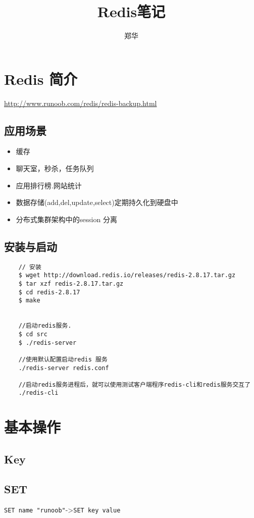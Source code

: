 \documentclass[UTF8,a4paper,12pt]{ctexbook}
\author{\kaishu 郑华}
\title{\heiti Redis笔记}
\begin{document}
 	\maketitle
  

\chapter{Redis 简介}
	
	\url{http://www.runoob.com/redis/redis-backup.html}
	
	\section{应用场景}
		\begin{itemize}
			\item 缓存
			\item 聊天室，秒杀，任务队列
			\item 应用排行榜.网站统计
			\item 数据存储(add,del,update,select)定期持久化到硬盘中
			\item 分布式集群架构中的session 分离
		\end{itemize}
	\section{安装与启动}
		\begin{lstlisting}
	// 安装
	$ wget http://download.redis.io/releases/redis-2.8.17.tar.gz
	$ tar xzf redis-2.8.17.tar.gz
	$ cd redis-2.8.17
	$ make	
	
	
	//启动redis服务.
	$ cd src
	$ ./redis-server
	
	//使用默认配置启动redis	服务
	./redis-server redis.conf
	
	//启动redis服务进程后，就可以使用测试客户端程序redis-cli和redis服务交互了	
	./redis-cli		
		\end{lstlisting}

\chapter{基本操作}	
	\section{Key}
	\section{SET}\verb|SET name "runoob"|->\verb|SET key value|
	
\end{document}
